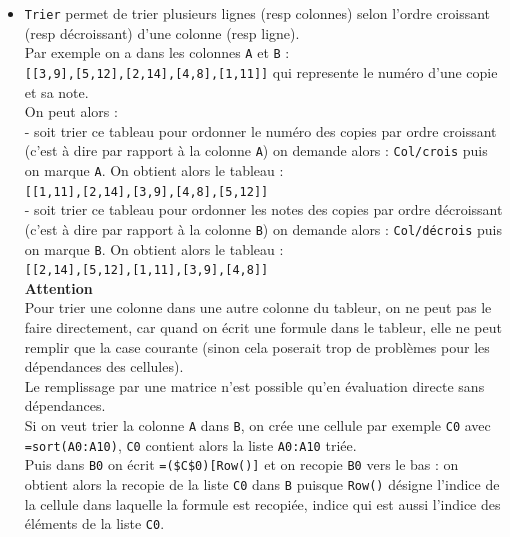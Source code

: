 \documentclass[a4paper,11pt]{book}
\begin{document}
\begin{itemize}
\begin{itemize}
pas recalcul\'e automatiquement : le recalcul ne se fait alors que si on appuie
sur le bouton {\tt eval},
\item {\tt Distribuer une matrice sur plusieurs cellules} pour remplir 
plusieurs cellules avec une matrice : par exemple si on s\'electionne {\tt A0}
et que l'on tape dans la ligne de commandes du tableur {\tt [1,2,3]}, cela 
remplira 3 cellules, en mettant 1 dans {\tt A0}, 2 dans {\tt B0} et 3 dans 
{\tt C0}, par contre si on tape dans la ligne de commandes du tableur
 {\tt =[1,2,3]} cela mettra [1,2,3] dans {\tt A0}.
\item {\tt Conserver une matrice dans une seule cellule}  permet de remplir une
cellule avec une matrice : par exemple si on s\'electionne {\tt A0}
et que l'on tape dans la ligne de commandes du tableur {\tt [1,2,3]} ou 
{\tt =[1,2,3]}, cela mettra [1,2,3] dans {\tt A0}.
\end{itemize}
\item {\tt Trier} permet de trier plusieurs lignes (resp colonnes) selon 
l'ordre croissant (resp d\'ecroissant) d'une colonne (resp ligne).\\
Par exemple on a dans les colonnes {\tt A} et {\tt B} :\\
{\tt [[3,9],[5,12],[2,14],[4,8],[1,11]]}
qui represente le num\'ero d'une copie et sa note.\\
On peut alors :\\
- soit trier ce tableau pour ordonner le num\'ero des copies par ordre
 croissant (c'est \`a dire par rapport \`a la colonne {\tt A}) on demande
 alors : {\tt Col/crois} puis on marque {\tt A}. 
On obtient alors le tableau :\\
{\tt [[1,11],[2,14],[3,9],[4,8],[5,12]]}\\
- soit trier ce tableau pour ordonner les notes des copies par ordre
 d\'ecroissant (c'est \`a dire par rapport \`a la colonne {\tt B}) on demande
 alors : {\tt Col/d\'ecrois} puis on marque {\tt B}.
On obtient alors le tableau :\\
{\tt [[2,14],[5,12],[1,11],[3,9],[4,8]]}\\
{\bf Attention}\\
Pour trier une colonne dans une autre colonne du tableur,
on ne peut pas le faire directement, car 
quand on \'ecrit une formule dans le tableur, elle ne peut remplir que la case 
courante (sinon cela poserait trop de probl\`emes pour les d\'ependances des 
cellules).\\
Le remplissage par une matrice n'est possible qu'en \'evaluation directe sans 
d\'ependances.\\
Si on veut trier la colonne {\tt A} dans {\tt B}, on cr\'ee une cellule
par exemple {\tt C0} avec {\tt =sort(A0:A10)}, {\tt C0} contient alors la 
liste  {\tt A0:A10} tri\'ee.\\
Puis dans {\tt B0} on \'ecrit {\tt =(\$C\$0)[Row()]} et on recopie {\tt B0} 
vers le bas : on obtient alors la recopie de la liste {\tt C0} dans {\tt B}
puisque {\tt Row()} d\'esigne l'indice de la cellule dans laquelle la formule 
est recopi\'ee, indice qui est aussi l'indice des \'el\'ements de la liste 
{\tt C0}.


\end{itemize}
\end{document}

